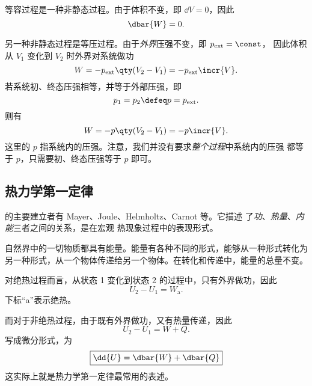 等容过程是一种非静态过程。由于体积不变，即 $\dd{V} = 0$，因此
\begin{equation} \label{eq:work-fixed-V}
  \dbar{W} = 0.
\end{equation}

另一种非静态过程是等压过程。由于\emph{外界}压强不变，即 $p_\text{ext}=\const$，
因此体积从 $V_1$ 变化到 $V_2$ 时外界对系统做功
\begin{equation}
  W = -p_\text{ext} \qty(V_2 - V_1) = -p_\text{ext} \incr{V}.
\end{equation}
若系统初、终态压强相等，并等于外部压强，即
\begin{equation}
  p_1 = p_2 \defeq p = p_\text{ext} .
\end{equation}
则有
\begin{equation} \label{eq:work-fixed-p}
  W = -p \qty(V_2 - V_1) = -p \incr{V}.
\end{equation}
这里的 $p$ 指系统内的压强。注意，我们并没有要求\emph{整个过程}中系统内的压强
都等于 $p$，只需要初、终态压强等于 $p$ 即可。

\subsection{热力学第一定律}

的主要建立者有 Mayer、Joule、Helmholtz、Carnot 等。它描述
了\emph{功}、\emph{热量}、\emph{内能}三者之间的关系，是在宏观
热现象过程中的表现形式。

\begin{theorem}[能量守恒定律]
  自然界中的一切物质都具有能量。能量有各种不同的形式，能够从一种形式转化为
  另一种形式，从一个物体传递给另一个物体。在转化和传递中，能量的总量不变。
\end{theorem}

对绝热过程而言，从状态 1 变化到状态 2 的过程中，只有外界做功，因此
\begin{equation}
  U_2 - U_1 = W_\text{a}.
\end{equation}
下标“a”表示绝热。

而对于非绝热过程，由于既有外界做功，又有热量传递，因此
\begin{equation} \label{eq:first-law-integral-form}
  U_2 - U_1 = W + Q.
\end{equation}
写成微分形式，为
\begin{equation} \label{eq:first-law-differential-form}
  \boxed{\dd{U} = \dbar{W} + \dbar{Q}}
\end{equation}
这实际上就是热力学第一定律最常用的表述。

